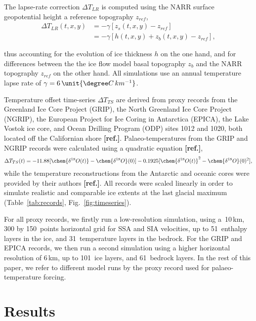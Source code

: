 \documentclass[tc, manuscript]{copernicus}
\newcommand{\aref}[0]{\textbf{[ref.]}}
\begin{document}
The lapse-rate correction ${\Delta}T_{LR}$ is computed using the NARR surface
geopotential height a reference topography $z_{ref}$,
\begin{align}
    {\Delta}T_{LR}(t, x, y) &= -\gamma [z_{s}(t, x, y)-z_{ref}] \\
                            &= -\gamma [h(t, x, y)+z_{b}(t, x, y)-z_{ref}],
\end{align}

thus accounting for the evolution of ice thickness $h$ on the one hand, and
for differences between the the ice flow model basal topography $z_{b}$ and the
NARR topography $z_{ref}$ on the other hand. All simulations use an annual temperature lapse rate of $\gamma = 6\,\unit{{\degree}C\,km^{-1}}$.

Temperature offset time-series ${\Delta}T_{TS}$ are derived from proxy records from
the Greenland Ice Core Project (GRIP), the North Greenland Ice Core Project
(NGRIP), the European Project for Ice Coring in Antarctica (EPICA), the Lake
Vostok ice core, and Ocean Drilling Program (ODP) sites 1012 and 1020, both
located off the Californian shore \aref. Palaeo-temperatures from the GRIP and
NGRIP records were calculated using a quadratic equation \aref,
\begin{equation}
    {\Delta}T_{TS}(t) = -11.88[\chem{\delta^{18}O(t)}-\chem{\delta^{18}O}(0)]
                        -0.1925[\chem{\delta^{18}O(t)}^2-\chem{\delta^{18}O}(0)^2],
\end{equation}
while the temperature reconstructions from the Antarctic and oceanic cores were
provided by their authors \aref. All records were scaled linearly in
order to simulate realistic and comparable ice extents at the last
glacial maximum (Table~\ref{tab:records}, Fig.~\ref{fig:timeseries}).

For all proxy records, we firstly run a low-resolution simulation, using
a~10\,km, 300 by 150~points horizontal grid for SSA and SIA velocities,
up to 51~enthalpy layers in the ice, and 31~temperature layers in the bedrock.
For the GRIP and EPICA records, we then run a second simulation using a higher
horizontal resolution of 6\,km, up to 101~ice layers, and 61~bedrock
layers. In the rest of this paper, we refer to different model runs by the
proxy record used for palaeo-temperature forcing.


\section{Results}
\label{sec:results}
\end{document}
